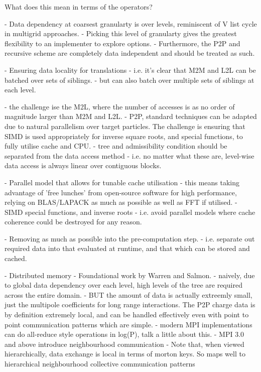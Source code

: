What does this mean in terms of the operators?

- Data dependency at coarsest granularty is over levels, reminiscent of V list cycle in multigrid approaches.
    - Picking this level of granularty gives the greatest flexibility to an implementer to explore options.
    - Furthermore, the P2P and recursive scheme are completely data independent and should be treated as such.

- Ensuring data locality for translations
    - i.e. it's clear that M2M and L2L can be batched over sets of siblings.
        - but can also batch over multiple sets of siblings at each level.

    - the challenge ise the M2L, where the number of accesses is as no order of magnitude larger than M2M and L2L.
    - P2P, standard techniques can be adapted due to natural parallelism over target particles. The challenge is ensuring that SIMD is used appropriately for inverse square roots, and special functions, to fully utilise cache and CPU.
    - tree and admissibility condition should be separated from the data access method
        - i.e. no matter what these are, level-wise data access is always linear over contiguous blocks.

- Parallel model that allows for tunable cache utilisation
    - this means taking advantage of 'free lunches' from open-source software for high performance, relying on BLAS/LAPACK as much as possible as well as FFT if utilised.
        - SIMD special functions, and inverse roots
    - i.e. avoid parallel models where cache coherence could be destroyed for any reason.

- Removing as much as possible into the pre-computation step.
    - i.e. separate out required data into that evaluated at runtime, and that which can be stored and cached.

- Distributed memory
    - Foundational work by Warren and Salmon.
    - naively, due to global data dependency over each level, high levels of the tree are required across the entire domain.
    - BUT the amount of data is actually extreemly small, just the multipole coefficients for long range interactions. The P2P charge data is by definition extremely local, and can be handled effectively even with point to point communication patterns which are simple.
    - modern MPI implementations can do all-reduce style operations in log(P), talk a little about this.
    - MPI 3.0 and above introduce neighbourhood communication
        - Note that, when viewed hierarchically, data exchange is local in terms of morton keys. So maps well to hierarchical neighbourhood collective communication patterns

